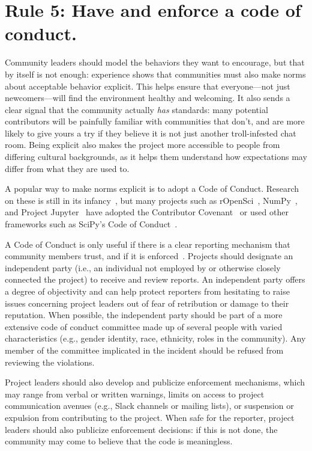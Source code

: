 \documentclass[10pt,letterpaper]{article}
\newcommand{\rulemajor}[1]{\section*{#1}}
\begin{document}
\rulemajor{Rule 5: Have and enforce a code of conduct.}

Community leaders should model the behaviors they want to encourage,
but that by itself is not enough:
experience shows that communities must also make norms about acceptable behavior explicit.
This helps ensure that everyone---not just newcomers---will find the environment healthy and welcoming.
It also sends a clear signal that the community actually \textit{has} standards:
many potential contributors will be painfully familiar with communities that don't,
and are more likely to give yours a try if they believe
it is not just another troll-infested chat room.
Being explicit also makes the project more accessible to people from differing cultural backgrounds,
as it helps them understand how expectations may differ from what they are used to.

A popular way to make norms explicit is to adopt a Code of Conduct.
Research on these is still in its infancy~\cite{tourani2017},
but many projects such as rOpenSci~\cite{ropensci-coc},
NumPy~\cite{numpy-coc},
and Project Jupyter~\cite{jupyter-coc}
have adopted the Contributor Covenant~\cite{covenant}
or used other frameworks such as SciPy's Code of Conduct~\cite{scipy-coc}.

A Code of Conduct is only useful if there is a clear reporting mechanism that community members trust,
and if it is enforced~\cite{aurora2019}.
Projects should designate an independent party
(i.e., an individual not employed by or otherwise closely connected the project)
to receive and review reports.
An independent party offers a degree of objectivity
and can help protect reporters from hesitating to raise issues concerning project leaders
out of fear of retribution or damage to their reputation.
When possible,
the independent party should be part of a more extensive code of conduct committee
made up of several people with varied characteristics
(e.g., gender identity, race, ethnicity, roles in the community).
Any member of the committee implicated in the incident should be refused from reviewing the violations.

Project leaders should also develop and publicize enforcement mechanisms,
which may range from verbal or written warnings,
limits on access to project communication avenues (e.g., Slack channels or mailing lists),
or suspension or expulsion from contributing to the project.
When safe for the reporter,
project leaders should also publicize enforcement decisions:
if this is not done,
the community may come to believe that the code is meaningless.
\end{document}
